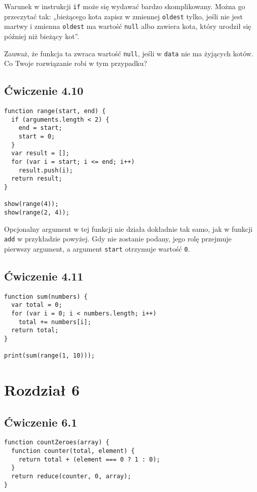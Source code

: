 Warunek w instrukcji \texttt{if} może się wydawać bardzo skomplikowany. Można go przeczytać tak: „bieżącego kota zapisz w zmiennej \texttt{oldest} tylko, jeśli nie jest martwy i zmienna \texttt{oldest} ma wartość \texttt{null} albo zawiera kota, który urodził się później niż bieżący kot”.
      
Zauważ, że funkcja ta zwraca wartość \texttt{null}, jeśli w \texttt{data} nie ma żyjących kotów. Co Twoje rozwiązanie robi w tym przypadku?


\subsection*{Ćwiczenie 4.10}
\label{sol:4.10}
      
\begin{verbatim} 
function range(start, end) {
  if (arguments.length < 2) {
    end = start;
    start = 0;
  }
  var result = [];
  for (var i = start; i <= end; i++)
    result.push(i);
  return result;
}

show(range(4));
show(range(2, 4));
\end{verbatim}
      
Opcjonalny argument w tej funkcji nie działa dokładnie tak samo, jak w funkcji \texttt{add} w przykładzie powyżej. Gdy nie zostanie podany, jego rolę przejmuje pierwszy argument, a argument \texttt{start} otrzymuje wartość \texttt{0}.


\subsection*{Ćwiczenie 4.11}
\label{sol:4.11}

\begin{verbatim} 
function sum(numbers) {
  var total = 0;
  for (var i = 0; i < numbers.length; i++)
    total += numbers[i];
  return total;
}

print(sum(range(1, 10)));
\end{verbatim}


\section*{Rozdział 6}
\label{sol:6}
  
\subsection*{Ćwiczenie 6.1}
\label{sol:6.1}
    
\begin{verbatim} 
function countZeroes(array) {
  function counter(total, element) {
    return total + (element === 0 ? 1 : 0);
  }
  return reduce(counter, 0, array);
}
 \end{verbatim}
    
